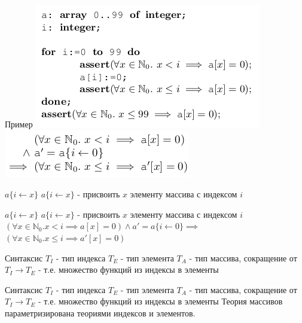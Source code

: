 \documentclass{beamer}
\begin{document}
\begin{frame}{Пример}
\includegraphics[scale=0.5]{code.png}
\includegraphics[scale=0.5]{conditions.png}
\end{frame}

\begin{frame}{$a\{i\leftarrow x\}$}
$a\{i\leftarrow x\}$ - присвоить $x$ элементу массива с индексом $i$\newline
\end{frame}

\begin{frame}{$a\{i\leftarrow x\}$}
$a\{i\leftarrow x\}$ - присвоить $x$ элементу массива с индексом $i$\newline
$(\forall x \in \mathbb{N}_0. x < i \implies a[x] = 0) \wedge a' = a\{i\leftarrow 0\} \implies$\newline
$(\forall x \in \mathbb{N}_0. x \le i \implies a'[x] = 0)$
\end{frame}

\begin{frame}{Синтаксис}
$T_I$ - тип индекса\newline
$T_E$ - тип элемента\newline
$T_A$ - тип массива, сокращение от $T_I \rightarrow T_E$ - т.е. множество функций из индексы в элементы\newline
\end{frame}

\begin{frame}{Синтаксис}
$T_I$ - тип индекса\newline
$T_E$ - тип элемента\newline
$T_A$ - тип массива, сокращение от $T_I \rightarrow T_E$ - т.е. множество функций из индексы в элементы\newline
Теория массивов параметризирована теориями индексов и элементов.
\end{frame}
\end{document}
